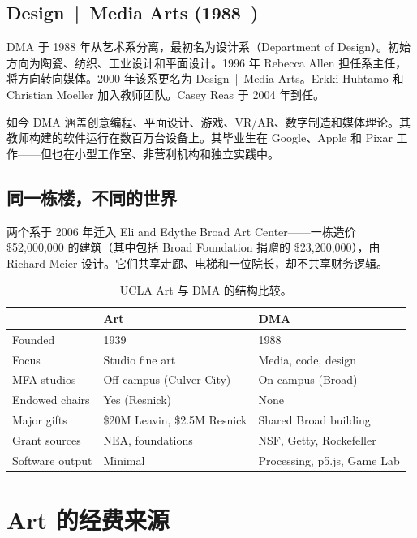 \documentclass[10pt,letterpaper,twocolumn]{article}
\newcommand{\dma}{\textsc{DMA}}
\begin{document}
\subsection{Design~|~Media Arts (1988--)}

\dma{} 于 1988 年从艺术系分离，最初名为设计系（Department of Design）。初始方向为陶瓷、纺织、工业设计和平面设计。1996 年 Rebecca Allen 担任系主任，将方向转向媒体。2000 年该系更名为 Design~|~Media Arts。Erkki Huhtamo 和 Christian Moeller 加入教师团队。Casey Reas 于 2004 年到任。

如今 \dma{} 涵盖创意编程、平面设计、游戏、VR/AR、数字制造和媒体理论。其教师构建的软件运行在数百万台设备上。其毕业生在 Google、Apple 和 Pixar 工作——但也在小型工作室、非营利机构和独立实践中。

\subsection{同一栋楼，不同的世界}

两个系于 2006 年迁入 Eli and Edythe Broad Art Center——一栋造价 \$52{,}000{,}000 的建筑（其中包括 Broad Foundation 捐赠的 \$23{,}200{,}000），由 Richard Meier 设计。它们共享走廊、电梯和一位院长，却不共享财务逻辑。

\begin{table}[h]
\small
\centering
\begin{tabularx}{\columnwidth}{lXX}
\toprule
& \textbf{Art} & \textbf{DMA} \\
\midrule
Founded & 1939 & 1988 \\
Focus & Studio fine art & Media, code, design \\
MFA studios & Off-campus (Culver City) & On-campus (Broad) \\
Endowed chairs & Yes (Resnick) & None \\
Major gifts & \$20M Leavin, \$2.5M Resnick & Shared Broad building \\
Grant sources & NEA, foundations & NSF, Getty, Rockefeller \\
Software output & Minimal & Processing, p5.js, Game Lab \\
\bottomrule
\end{tabularx}
\caption{UCLA Art 与 \dma{} 的结构比较。}
\label{tab:comparison}
\end{table}

\section{Art 的经费来源}
\end{document}
